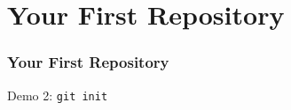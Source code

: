 \section[Section]{Your First Repository}

\begin{frame}
    \frametitle{Your First Repository}
    \alert{Demo 2}: \texttt{git init}
\end{frame}
